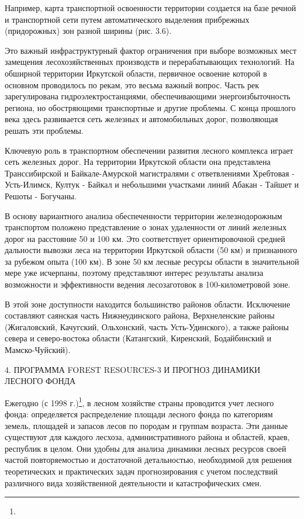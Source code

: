\documentclass{report}
\begin{document}
Например, карта транспортной освоенности территории создается на базе речной и транспортной сети путем автоматического
выделения прибрежных (придорожных) зон разной ширины (рис. 3.6). 

Это важный инфраструктурный фактор ограничения при выборе возможных мест замещения лесохозяйственных производств и
перерабатывающих  технологий. На обширной  территории  Иркутской  области, первичное освоение которой в основном
проводилось по рекам, это весьма важный вопрос. Часть рек зарегулирована гидроэлектростанциями,  обеспечивающими
энергоизбыточность региона, но обостряющими транспортные и другие проблемы. С конца прошлого века здесь развивается
сеть железных и автомобильных дорог, позволяющая решать эти проблемы.

Ключевую роль в транспортном обеспечении развития лесного комплекса играет сеть железных дорог. На территории Иркутской
области она представлена  Транссибирской и Байкале-Амурской магистралями с ответвлениями Хребтовая - Усть-Илимск,
Култук - Байкал и небольшими участками линий Абакан - Тайшет и Решоты - Богучаны.

В основу вариантного анализа обеспеченности территории железнодорожным транспортом положено представление о зонах
удаленности от линий железных дорог на расстояние 50 и 100 км. Это соответствует ориентировочной средней дальности
вывозки леса на территории Иркутской области (50 км) и признанного за рубежом опыта (100 км). В зоне 50 км лесные
ресурсы области в значительной мере уже исчерпаны, поэтому представляют интерес результаты анализа возможности  и 
эффективности  ведения  лесозаготовок  в  100-километровой зоне.

В этой зоне доступности находится большинство районов области. Исключение составляют саянская часть Нижнеудинского
района, Верхнеленские районы (Жигаловский, Качугский, Ольхонский, часть Усть-Удинского), а также районы севера и
северо-востока области (Катангский, Киренский, Бодайбинский и Мамско-Чуйский). 

4.  ПРОГРАММА FOREST RESOURCES{}-3 И ПРОГНОЗ ДИНАМИКИ ЛЕСНОГО ФОНДА 

Ежегодно (с 1998 г.)\footnote{ }, в
лесном хозяйстве страны проводится учет лесного фонда: определяется распределение площади лесного фонда по категориям
земель, площадей и запасов лесов по породам и группам возраста. Эти данные существуют для  каждого  лесхоза, 
административного  района и областей, краев, республик в целом. Они удобны для анализа динамики лесных  ресурсов своей
частой  повторяемостью и достаточной детальностью, необходимой для решения  теоретических и практических задач
прогнозирования с учетом последствий  различного  вида хозяйственной деятельности и катастрофических смен.
\end{document}
